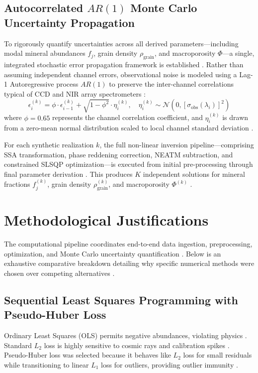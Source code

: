 \documentclass[11pt,a4paper]{article}
\begin{document}
\subsection{Autocorrelated $AR(1)$ Monte Carlo Uncertainty Propagation}
To rigorously quantify uncertainties across all derived parameters—including modal mineral abundances $f_j$, grain density $\rho_{\text{grain}}$, and macroporosity $\Phi$—a single, integrated stochastic error propagation framework is established \cite{Efron1993, Press2007}. Rather than assuming independent channel errors, observational noise is modeled using a Lag-1 Autoregressive process $AR(1)$ to preserve the inter-channel correlations typical of CCD and NIR array spectrometers \cite{Efron1993, Press2007}:
\begin{equation}
\epsilon_i^{(k)} = \phi \cdot \epsilon_{i-1}^{(k)} + \sqrt{1 - \phi^2} \cdot \eta_i^{(k)}, \quad \eta_i^{(k)} \sim \mathcal{N}\left(0, [\sigma_{\text{obs}}(\lambda_i)]^2\right)
\label{eq:ar1_noise}
\end{equation}
where $\phi = 0.65$ represents the channel correlation coefficient, and $\eta_i^{(k)}$ is drawn from a zero-mean normal distribution scaled to local channel standard deviation \cite{Efron1993, Press2007}.

For each synthetic realization $k$, the full non-linear inversion pipeline—comprising SSA transformation, phase reddening correction, NEATM subtraction, and constrained SLSQP optimization—is executed from initial pre-processing through final parameter derivation \cite{Hapke1981, Lawson1995, Huber1964}. This produces $K$ independent solutions for mineral fractions $f_j^{(k)}$, grain density $\rho_{\text{grain}}^{(k)}$, and macroporosity $\Phi^{(k)}$ \cite{Consolmagno2008, Carry2012}.

\section{Methodological Justifications}
The computational pipeline coordinates end-to-end data ingestion, preprocessing, optimization, and Monte Carlo uncertainty quantification \cite{Tarantola2005, Press2007}. Below is an exhaustive comparative breakdown detailing why specific numerical methods were chosen over competing alternatives \cite{Lawson1995, Huber1964, Akaike1974}.

\subsection{Sequential Least Squares Programming with Pseudo-Huber Loss}
Ordinary Least Squares (OLS) permits negative abundances, violating physics \cite{Lawson1995}. Standard $L_2$ loss is highly sensitive to cosmic rays and calibration spikes \cite{Huber1964, Press2007}. Pseudo-Huber loss was selected because it behaves like $L_2$ loss for small residuals while transitioning to linear $L_1$ loss for outliers, providing outlier immunity \cite{Huber1964, Press2007}.
\end{document}
